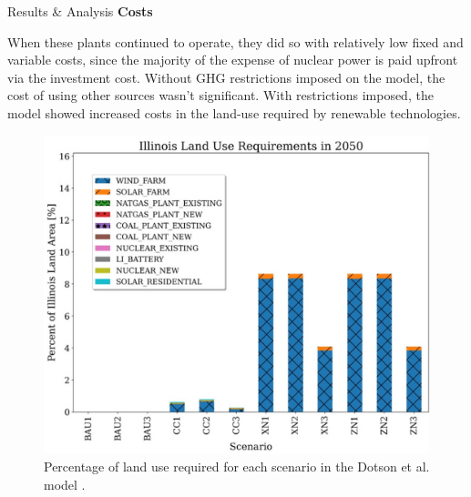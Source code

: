 \documentclass[final]{beamer}
\newlength{\onecolwid}
\newlength{\threecolwid}
\begin{document}
\begin{frame}[t]
\begin{columns}[t,totalwidth=\threecolwid]
\begin{column}{\onecolwid}
\begin{block}{Results \& Analysis}
\vspace{0.7em}
\textbf{Costs}
\vspace{0.7em}




When these plants continued to operate, they did so with relatively low fixed and variable costs, since the majority of the expense of nuclear power is paid upfront via the investment cost. Without GHG restrictions imposed on the model, the cost of using other sources wasn’t significant. With restrictions imposed, the model showed increased costs in the land-use required by renewable technologies.


\begin{figure}[ht] %
  \centering
  \includegraphics[scale=2.7]{land-use.png}
  \caption{Percentage of land use required for each scenario in the Dotson et al. model \cite{dotson}.}
  \label{fig:landuse}
\end{figure}


\end{block}
\end{column}
\end{columns}
\end{frame}
\end{document}
